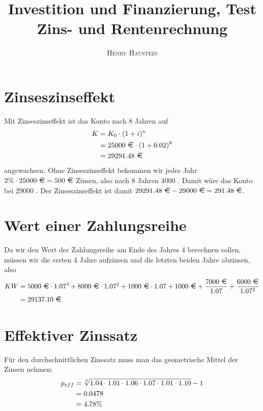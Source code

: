 \documentclass{article}
\title{\textbf{Investition und Finanzierung, Test Zins- und Rentenrechnung}}
\author{\textsc{Henry Haustein}}
\date{}
\begin{document}
	\maketitle
	
	\section*{Zinseszinseffekt}
	Mit Zinseszinseffekt ist das Konto nach 8 Jahren auf
	\begin{align}
		K &= K_0 \cdot (1+i)^n \notag \\
		&= 25000\text{ \EUR} \cdot (1+0.02)^8 \notag \\
		&= 29291.48\text{ \EUR} \notag
	\end{align}
	angewachsen. Ohne Zinseszinseffekt bekommen wir jedes Jahr $2\%\cdot 25000\text{ \EUR} = 500\text{ \EUR}$ Zinsen, also nach 8 Jahren 4000 \EUR. Damit wäre das Konto bei 29000 \EUR. Der Zinseszinseffekt ist damit $29291.48\text{ \EUR} - 29000\text{ \EUR} = 291.48\text{ \EUR}$.

	\section*{Wert einer Zahlungsreihe}
	Da wir den Wert der Zahlungsreihe am Ende des Jahres 4 berechnen sollen, müssen wir die ersten 4 Jahre aufzinsen und die letzten beiden Jahre abzinsen, also
	\begin{align}
		KW &= 5000\text{ \EUR} \cdot 1.07^3 + 8000\text{ \EUR} \cdot 1.07^2 + 1000\text{ \EUR} \cdot 1.07 + 1000\text{ \EUR} + \frac{7000\text{ \EUR}}{1.07} + \frac{6000\text{ \EUR}}{1.07^2} \notag \\
		&= 29137.10\text{ \EUR} \notag
	\end{align}
	
	\section*{Effektiver Zinssatz}
	Für den durchschnittlichen Zinssatz muss man das geometrische Mittel der Zinsen nehmen:
	\begin{align}
		p_{eff} &= \sqrt[6]{1.04\cdot 1.01\cdot 1.06\cdot 1.07\cdot 1.01\cdot 1.10} - 1 \notag \\
		&= 0.0478 \notag \\
		&= 4.78\% \notag
	\end{align}
	
\end{document}
